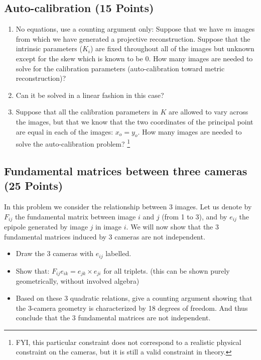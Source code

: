 \documentclass[11pt]{article}
\begin{document}
\subsection{Auto-calibration (15 Points)}
\begin{enumerate}
\item No equations, use a counting argument only: Suppose that we have
$m$ images from which we have generated a projective reconstruction.
Suppose that the intrinsic parameters ($K_i$) are fixed throughout all of
the images but unknown except for the skew which is known to be $0$.
How many images are needed to solve for the calibration parameters
(auto-calibration toward metric reconstruction)?
\item Can it be solved in a linear fashion in this case?
\item Suppose that all the calibration parameters in $K$ are allowed to vary
across the images, but that we know that the two coordinates of the
principal point are equal in each of the images: $x_o = y_o$. How many
images are needed to solve the auto-calibration problem?
\footnote{FYI, this particular constraint does not correspond to a realistic physical constraint on the cameras, but it is still a valid constraint in theory.}

\end{enumerate}


\subsection{Fundamental matrices between three cameras (25 Points)}
In this problem we consider the relationship between $3$ images. Let us denote by $F_{ij}$ the fundamental matrix between image $i$ and $j$ (from 1 to 3), and by $e_{ij}$ the epipole generated by image $j$ in image $i$. We will now show that the $3$ fundamental matrices induced by $3$ cameras are not independent. 

\begin{itemize}
\item Draw the 3 cameras with $e_{ij}$ labelled.
\item Show that: $F_{ij}e_{ik} = e_{jk} \times e_{ji}$ for all triplets. (this can be shown purely geometrically, without 
involved algebra)
\item Based on these 3 quadratic relations, give a counting argument showing that the 3-camera geometry is characterized by 18 degrees of freedom. And thus conclude that the $3$ fundamental matrices are not independent.
\end{itemize}
\end{document}
